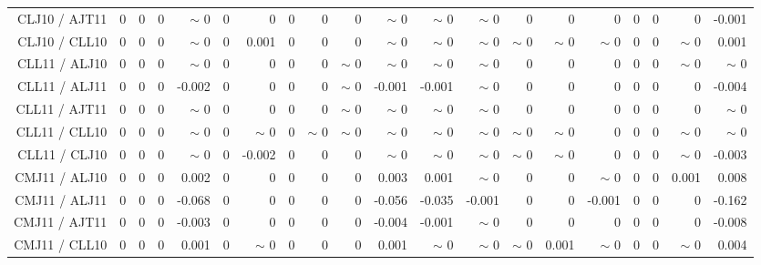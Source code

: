 \begin{table}[H]
\begin{center}
\begin{tabular}{|r|rrrrrrrrrrrrrrrrrr|r|}
CLJ10 / AJT11 &  0 &  0 &  0 &  {\tiny $\sim$ }0 &  0 &  0 &  0 &  0 &  0 &  {\tiny $\sim$ }0 &  {\tiny $\sim$ }0 &  {\tiny $\sim$ }0 &  0 &  0 &  0 &  0 &  0 &  0 &     -0.001 \\
CLJ10 / CLL10 &  0 &  0 &  0 &  {\tiny $\sim$ }0 &  0 &      0.001 &  0 &  0 &  0 &  {\tiny $\sim$ }0 &  {\tiny $\sim$ }0 &  {\tiny $\sim$ }0 &  {\tiny $\sim$ }0 &  {\tiny $\sim$ }0 &  {\tiny $\sim$ }0 &  0 &  0 &  {\tiny $\sim$ }0 &      0.001 \\
CLL11 / ALJ10 &  0 &  0 &  0 &  {\tiny $\sim$ }0 &  0 &  0 &  0 &  0 &  {\tiny $\sim$ }0 &  {\tiny $\sim$ }0 &  {\tiny $\sim$ }0 &  {\tiny $\sim$ }0 &  0 &  0 &  0 &  0 &  0 &  {\tiny $\sim$ }0 &  {\tiny $\sim$ }0 \\
CLL11 / ALJ11 &  0 &  0 &  0 &     -0.002 &  0 &  0 &  0 &  0 &  {\tiny $\sim$ }0 &     -0.001 &     -0.001 &  {\tiny $\sim$ }0 &  0 &  0 &  0 &  0 &  0 &  0 &     -0.004 \\
CLL11 / AJT11 &  0 &  0 &  0 &  {\tiny $\sim$ }0 &  0 &  0 &  0 &  0 &  {\tiny $\sim$ }0 &  {\tiny $\sim$ }0 &  {\tiny $\sim$ }0 &  {\tiny $\sim$ }0 &  0 &  0 &  0 &  0 &  0 &  0 &  {\tiny $\sim$ }0 \\
CLL11 / CLL10 &  0 &  0 &  0 &  {\tiny $\sim$ }0 &  0 &  {\tiny $\sim$ }0 &  0 &  {\tiny $\sim$ }0 &  {\tiny $\sim$ }0 &  {\tiny $\sim$ }0 &  {\tiny $\sim$ }0 &  {\tiny $\sim$ }0 &  {\tiny $\sim$ }0 &  {\tiny $\sim$ }0 &  0 &  0 &  0 &  {\tiny $\sim$ }0 &  {\tiny $\sim$ }0 \\
CLL11 / CLJ10 &  0 &  0 &  0 &  {\tiny $\sim$ }0 &  0 &     -0.002 &  0 &  0 &  0 &  {\tiny $\sim$ }0 &  {\tiny $\sim$ }0 &  {\tiny $\sim$ }0 &  {\tiny $\sim$ }0 &  {\tiny $\sim$ }0 &  0 &  0 &  0 &  {\tiny $\sim$ }0 &     -0.003 \\
CMJ11 / ALJ10 &  0 &  0 &  0 &      0.002 &  0 &  0 &  0 &  0 &  0 &      0.003 &      0.001 &  {\tiny $\sim$ }0 &  0 &  0 &  {\tiny $\sim$ }0 &  0 &  0 &      0.001 &      0.008 \\
CMJ11 / ALJ11 &  0 &  0 &  0 &     -0.068 &  0 &  0 &  0 &  0 &  0 &     -0.056 &     -0.035 &     -0.001 &  0 &  0 &     -0.001 &  0 &  0 &  0 &     -0.162 \\
CMJ11 / AJT11 &  0 &  0 &  0 &     -0.003 &  0 &  0 &  0 &  0 &  0 &     -0.004 &     -0.001 &  {\tiny $\sim$ }0 &  0 &  0 &  0 &  0 &  0 &  0 &     -0.008 \\
CMJ11 / CLL10 &  0 &  0 &  0 &      0.001 &  0 &  {\tiny $\sim$ }0 &  0 &  0 &  0 &      0.001 &  {\tiny $\sim$ }0 &  {\tiny $\sim$ }0 &  {\tiny $\sim$ }0 &      0.001 &  {\tiny $\sim$ }0 &  0 &  0 &  {\tiny $\sim$ }0 &      0.004 \\

\end{tabular}
\end{center}
\end{table}

